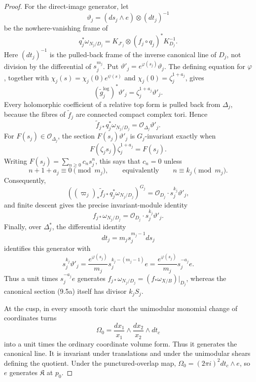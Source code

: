 \begin{proof}
For the direct-image generator, let
\[
 \vartheta_j=(ds_j\wedge e)\otimes(dt_j)^{-1}
\tag{9.5c}
\]
be the nowhere-vanishing frame of
\[
 q_j^*\omega_{N_j/D_j}
 =K_{J'_j}\otimes(f_j\circ q_j)^*K_{D_j}^{-1}.
\]
Here \((dt_j)^{-1}\) is the pulled-back frame of the inverse canonical line
of \(D_j\), not division by the differential of \(s_j^{m_j}\).  Put
\(\vartheta'_j=e^{\varphi(s_j)}\vartheta_j\).  The defining equation for
\(\varphi\), together with
\(\chi_j(s)=\chi_j(0)e^{\psi(s)}\) and
\(\chi_j(0)=\zeta_j^{1+a_j}\), gives
\[
 (\widetilde g_j^{\log})^*\vartheta'_j
 =\zeta_j^{1+a_j}\vartheta'_j.
\tag{9.5d}
\]
Every holomorphic coefficient of a relative top form is pulled back from
\(\Delta_j\), because the fibres of \(\widetilde f_j\) are connected compact
complex tori.  Hence
\[
 \widetilde f_{j*}q_j^*\omega_{N_j/D_j}
 =\mathcal O_{\Delta_j}\vartheta'_j.
\]
For \(F(s_j)\in\mathcal O_{\Delta_j}\), the section
\(F(s_j)\vartheta'_j\) is \(G_j\)-invariant exactly when
\[
 F(\zeta_js_j)\zeta_j^{1+a_j}=F(s_j).
\tag{9.5e}
\]
Writing \(F(s_j)=\sum_{n\ge0}c_ns_j^n\), this says that \(c_n=0\) unless
\[
 n+1+a_j\equiv0\pmod {m_j},
 \qquad\text{equivalently}\qquad n\equiv k_j\pmod {m_j}.
\]
Consequently,
\[
 \left((\varpi_j)_*\widetilde f_{j*}
 q_j^*\omega_{N_j/D_j}\right)^{G_j}
 =\mathcal O_{D_j}\cdot s_j^{k_j}\vartheta'_j,
\]
and finite descent gives the precise invariant-module identity
\[
 f_{j*}\omega_{N_j/D_j}
 =\mathcal O_{D_j}\cdot s_j^{k_j}\vartheta'_j.
\tag{9.5f}
\]
Finally, over \(\Delta_j^*\), the differential identity
\[
 dt_j=m_js_j^{m_j-1}ds_j
\]
identifies this generator with
\[
 s_j^{k_j}\vartheta'_j
 =\frac{e^{\varphi(s_j)}}{m_j}
 s_j^{k_j-(m_j-1)}e
 =\frac{e^{\varphi(s_j)}}{m_j}s_j^{-a_j}e.
\tag{9.5g}
\]
Thus a unit times \(s_j^{-a_j}e\) generates
\(f_{j*}\omega_{N_j/D_j}=(f_*\omega_{X/B})|_{D_j}\), whereas the
canonical section (9.5a) itself has divisor \(k_jS_j\).

At the cusp, in every smooth toric chart the unimodular monomial change of
coordinates turns
\[
 \Omega_0=\frac{dx_1}{x_1}\wedge
          \frac{dx_2}{x_2}\wedge dt_c
\]
into a unit times the ordinary coordinate volume form.  Thus it generates
the canonical line.  It is invariant under translations and under the
unimodular shears defining the quotient.  Under the punctured-overlap map,
\(\Omega_0=(2\pi i)^2dt_c\wedge e\), so \(e\) generates
\(\mathfrak K\) at \(p_0\).


\end{proof}
